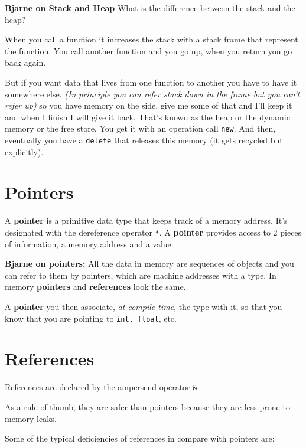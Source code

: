 \documentclass[11pt, a4paper]{article}
\begin{document}
\textbf{Bjarne on Stack and Heap} What is the difference between the stack and the heap?


When you call a function it increases the stack with a stack frame that represent the function. You call another function and you go up, when you return you go back again. 

But if you want data that lives from one function to another you have to have it somewhere else. \textit{(In principle you can refer stack down in the frame but you can't refer up)} so you have memory on the side, give me some of that and I'll keep it and when I finish I will give it back. That's known as the heap or the dynamic memory or the free store. You get it with an operation call \texttt{new}. And then, eventually you have a \texttt{delete}  that releases this memory (it gets recycled but explicitly).  


\section{Pointers}%
\label{sec:pointers}



A \textbf{pointer} is a primitive data type that keeps track of a memory address. It's designated with the dereference operator \texttt{*}. A \textbf{pointer} provides access to 2 pieces of information, a memory address and a value. 


\textbf{Bjarne on pointers:} All the data in memory are sequences of objects and you can refer to them by pointers, which are machine addresses with a type. In memory \textbf{pointers} and \textbf{references} look the same. 

A \textbf{pointer} you then associate, \textit{at compile time}, the type with it, so that you know that you are pointing to \texttt{int, float}, etc.  






\section{References}%
\label{sec:references}


References are declared by the ampersend operator \texttt{\&}. 

As a rule of thumb, they are safer than pointers because they are less prone to memory leaks. 

Some of the typical deficiencies of references in compare with pointers are:
\end{document}
